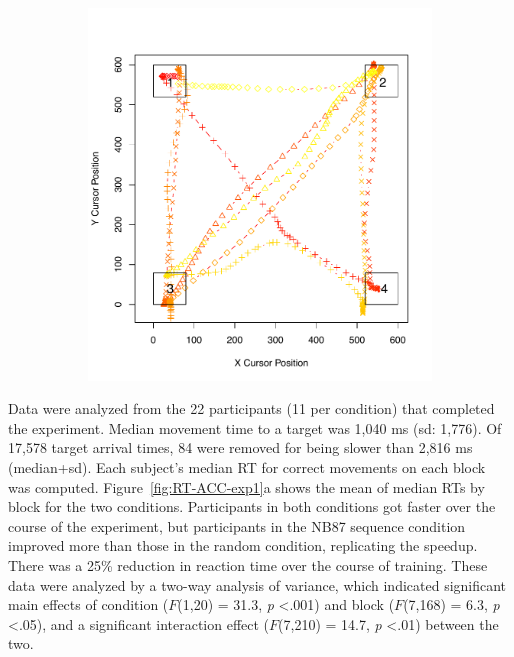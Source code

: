 \documentclass[man,floatsintext]{apa6}
\begin{document}
\begin{figure}[t]
\begin{subfigure}[t]{0.49\textwidth}
                \includegraphics[width=.95\textwidth]{figures/1trial_s6tr5_NB87}
        \end{subfigure}
        \label{fig:ex-trial}
\end{figure}

\addtocounter{figure}{-1}

Data were analyzed from the 22 participants (11 per condition) that completed the experiment. Median movement time to a target was 1,040 ms (sd: 1,776). Of 17,578 target arrival times, 84 were removed for being slower than 2,816 ms (median+sd). Each subject's median RT for correct movements on each block was computed. Figure~\ref{fig:RT-ACC-exp1}a shows the mean of median RTs by block for the two conditions. Participants in both conditions got faster over the course of the experiment, but participants in the NB87 sequence condition improved more than those in the random condition, replicating the  speedup. There was a 25\% reduction in reaction time over the course of training. These data were analyzed by a two-way analysis of variance, which indicated significant main effects of condition ($F$(1,20) = 31.3, \textit{p} \textless .001) and block ($F$(7,168) = 6.3, \textit{p} \textless .05), and a significant interaction effect ($F$(7,210) = 14.7, \textit{p} \textless .01) between the two.
\end{document}
